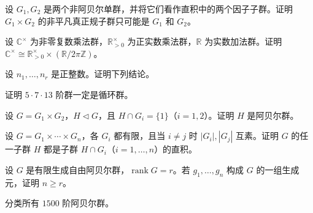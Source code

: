 \newpage
\noindent\begin{minipage}{\textwidth}
设 $G_1,G_2$ 是两个非阿贝尔单群，并将它们看作直积中的两个因子子群。证明 $G_1\times G_2$ 的非平凡真正规子群只可能是 $G_1$ 和 $G_2$。
\end{minipage}\par\vfill
\noindent\begin{minipage}{\textwidth}
设 $\mathbb C^\times$ 为非零复数乘法群，$\mathbb R_{>0}^\times$ 为正实数乘法群，$\mathbb R$ 为实数加法群。证明 $\mathbb C^\times\cong\mathbb R_{>0}^\times\times(\mathbb R/2\pi\mathbb Z)$。
\end{minipage}\par\vfill
\noindent\begin{minipage}{\textwidth}
设 $n_1,\ldots,n_r$ 是正整数。证明下列结论。
\end{minipage}\par\vfill
\newpage
\noindent\begin{minipage}{\textwidth}
证明 $5\cdot7\cdot13$ 阶群一定是循环群。
\end{minipage}\par\vfill
\noindent\begin{minipage}{\textwidth}
设 $G=G_1\times G_2$，$H\triangleleft G$，且 $H\cap G_i=\{1\}$（$i=1,2$）。证明 $H$ 是阿贝尔群。
\end{minipage}\par\vfill
\noindent\begin{minipage}{\textwidth}
设 $G=G_1\times\cdots\times G_n$，各 $G_i$ 都有限，且当 $i\ne j$ 时 $|G_i|,|G_j|$ 互素。证明 $G$ 的任一子群 $H$ 都是子群 $H\cap G_i$（$i=1,\ldots,n$）的直积。
\end{minipage}\par\vfill
\newpage
\noindent\begin{minipage}{\textwidth}
设 $G$ 是有限生成自由阿贝尔群，$\operatorname{rank}G=r$。若 $g_1,\ldots,g_n$ 构成 $G$ 的一组生成元，证明 $n\ge r$。
\end{minipage}\par\vfill
\noindent\begin{minipage}{\textwidth}
分类所有 $1500$ 阶阿贝尔群。
\end{minipage}\par\vfill
